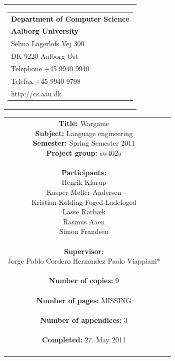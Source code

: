 \begin{nopagebreak}
\samepage 
\begin{tabular}{r}
\parbox{\textwidth}{
\hfill \parbox{6.2cm}{\begin{tabular}{l}
{\textsf\small \textbf{Department of Computer Science }}\\
{\textsf\small  \textbf{Aalborg University}}\\
{\textsf\small Selma Lagerlöfs Vej 300}\\
{\textsf\small DK-9220 Aalborg Øst}\\
{\textsf\small Telephone +45 9940 9940}\\
{\textsf\small Telefax +45 9940 9798}\\
{\textsf\small http://cs.aau.dk}
\end{tabular}}}
\end{tabular}

\begin{tabular}{cc}
\parbox{7cm}{
\textbf{Title:} 
Wargame\\
\textbf{Subject:} 
Language engineering \\
\textbf{Semester:} Spring Semester 2011\\
\textbf{Project group:} sw402a\\ \\
\textbf{Participants:} \\
Henrik Klarup \\
Kasper Møller Andersen \\
Kristian Kolding Foged-Ladefoged \\
Lasse Rørbæk \\
Rasmus Aaen \\
Simon Frandsen \\ \\
\textbf{Supervisor:} \\
Jorge Pablo Cordero Hernandez
Paolo Viappiani*\\ \\
\textbf{Number of copies:}
 9 \\ \\
\textbf{Number of pages:}
MISSING \\ \\
\textbf{Number of appendices:}
 3 \\ \\
\textbf{Completed:}
27. May 2011 \\ \\
}


\end{tabular}
\end{nopagebreak}
